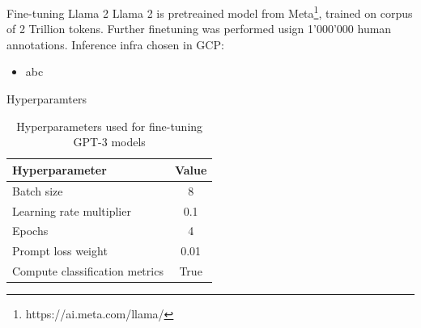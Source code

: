 \documentclass[aspectratio=149]{beamer}
\begin{document}
\begin{frame}{Fine-tuning Llama 2}
Llama 2 is pretreained model from Meta\footnote{https://ai.meta.com/llama/}, trained on corpus of 2 Trillion tokens. Further finetuning was performed usign 1'000'000 human annotations.
Inference infra chosen in GCP:
\begin{itemize}
  \item abc
\end{itemize}
\end{frame}
\begin{frame}{Hyperparamters}
\centering
\begin{table}
\label{tab:finetuning-hyperparams}
\begin{tabular}{lc}
        \toprule
        \textbf{Hyperparameter}        & \textbf{Value} \\
        \midrule
        Batch size                     & 8              \\ 
        Learning rate multiplier       & 0.1            \\ 
        Epochs                         & 4              \\ 
        Prompt loss weight             & 0.01           \\ 
        Compute classification metrics & True           \\ 
\bottomrule
    \end{tabular}
\caption{Hyperparameters used for fine-tuning GPT-3 models}
\end{table}
\end{frame}


\end{document}
